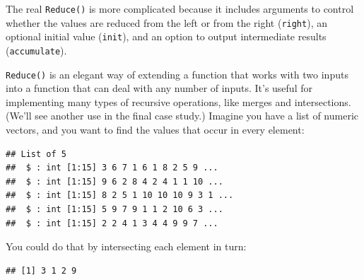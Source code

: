 The real \texttt{Reduce()} is more complicated because it includes
arguments to control whether the values are reduced from the left or
from the right (\texttt{right}), an optional initial value
(\texttt{init}), and an option to output intermediate results
(\texttt{accumulate}).

\texttt{Reduce()} is an elegant way of extending a function that works
with two inputs into a function that can deal with any number of inputs.
It's useful for implementing many types of recursive operations, like
merges and intersections. (We'll see another use in the final case
study.) Imagine you have a list of numeric vectors, and you want to find
the values that occur in every element:

\begin{Shaded}
\begin{Highlighting}[]
\StringTok{ }\NormalTok{(}\NormalTok{, }\NormalTok{(}\OperatorTok{:}\NormalTok{, }\NormalTok{, } \NormalTok{)}
\end{Highlighting}
\end{Shaded}

\begin{verbatim}
## List of 5
##  $ : int [1:15] 3 6 7 1 6 1 8 2 5 9 ...
##  $ : int [1:15] 9 6 2 8 4 2 4 1 1 10 ...
##  $ : int [1:15] 8 2 5 1 10 10 10 9 3 1 ...
##  $ : int [1:15] 5 9 7 9 1 1 2 10 6 3 ...
##  $ : int [1:15] 2 2 4 1 3 4 4 9 9 7 ...
\end{verbatim}

You could do that by intersecting each element in turn:

\begin{Shaded}
\begin{Highlighting}[]
\NormalTok{(}\NormalTok{(}\NormalTok{(}\NormalTok{(l[[}\NormalTok{]], l[[}\NormalTok{]]),}
\NormalTok{  l[[}\NormalTok{]]), l[[}\NormalTok{]]), l[[}\NormalTok{]])}
\end{Highlighting}
\end{Shaded}

\begin{verbatim}
## [1] 3 1 2 9
\end{verbatim}

